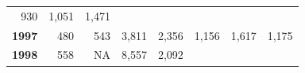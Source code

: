 \documentclass[]{article}
\begin{document}
\begin{longtable}[]{@{}rrrrrrrr@{}}
\begin{minipage}[t]{0.09\columnwidth}
930\strut
\end{minipage} & \begin{minipage}[t]{0.08\columnwidth}\raggedleft\strut
1,051\strut
\end{minipage} & \begin{minipage}[t]{0.10\columnwidth}\raggedleft\strut
1,471\strut
\end{minipage}\tabularnewline
\begin{minipage}[t]{0.08\columnwidth}\raggedleft\strut
\textbf{1997}\strut
\end{minipage} & \begin{minipage}[t]{0.10\columnwidth}\raggedleft\strut
480\strut
\end{minipage} & \begin{minipage}[t]{0.11\columnwidth}\raggedleft\strut
543\strut
\end{minipage} & \begin{minipage}[t]{0.08\columnwidth}\raggedleft\strut
3,811\strut
\end{minipage} & \begin{minipage}[t]{0.14\columnwidth}\raggedleft\strut
2,356\strut
\end{minipage} & \begin{minipage}[t]{0.09\columnwidth}\raggedleft\strut
1,156\strut
\end{minipage} & \begin{minipage}[t]{0.08\columnwidth}\raggedleft\strut
1,617\strut
\end{minipage} & \begin{minipage}[t]{0.10\columnwidth}\raggedleft\strut
1,175\strut
\end{minipage}\tabularnewline
\begin{minipage}[t]{0.08\columnwidth}\raggedleft\strut
\textbf{1998}\strut
\end{minipage} & \begin{minipage}[t]{0.10\columnwidth}\raggedleft\strut
558\strut
\end{minipage} & \begin{minipage}[t]{0.11\columnwidth}\raggedleft\strut
NA\strut
\end{minipage} & \begin{minipage}[t]{0.08\columnwidth}\raggedleft\strut
8,557\strut
\end{minipage} & \begin{minipage}[t]{0.14\columnwidth}\raggedleft\strut
2,092\strut
\end{minipage} & \begin{minipage}[t]{0.09\columnwidth}\raggedleft\strut

\end{minipage}
\end{longtable}
\end{document}
